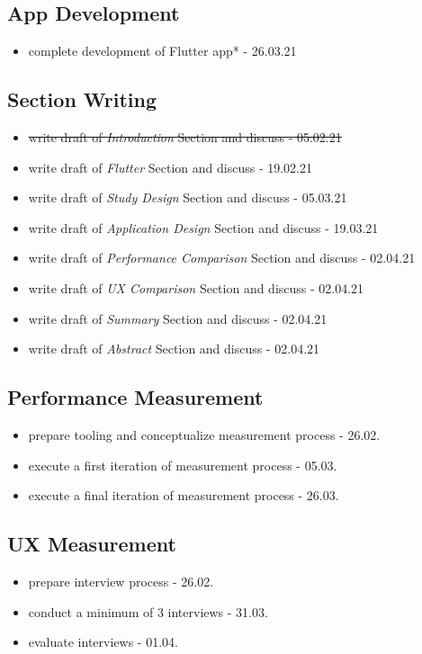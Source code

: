 \subsection{App Development}
\begin{itemize}
    \item complete development of Flutter app* - 26.03.21
\end{itemize}


\subsection{Section Writing}
\begin{itemize}
    \item \sout{write draft of \textit{Introduction} Section and discuss - 05.02.21}
    \item write draft of \textit{Flutter} Section and discuss - 19.02.21
    \item write draft of \textit{Study Design} Section and discuss - 05.03.21
    \item write draft of \textit{Application Design} Section and discuss - 19.03.21
    \item write draft of \textit{Performance Comparison} Section and discuss - 02.04.21
    \item write draft of \textit{UX Comparison} Section and discuss - 02.04.21
    \item write draft of \textit{Summary} Section and discuss - 02.04.21
    \item write draft of \textit{Abstract} Section and discuss - 02.04.21
\end{itemize}


\subsection{Performance Measurement}
\begin{itemize}
    \item prepare tooling and conceptualize measurement process - 26.02.
    \item execute a first iteration of measurement process - 05.03.
    \item execute a final iteration of measurement process - 26.03.
\end{itemize}

\subsection{UX Measurement}
\begin{itemize}
    \item prepare interview process - 26.02.
    \item conduct a minimum of 3 interviews - 31.03.
    \item evaluate interviews - 01.04.
\end{itemize}

